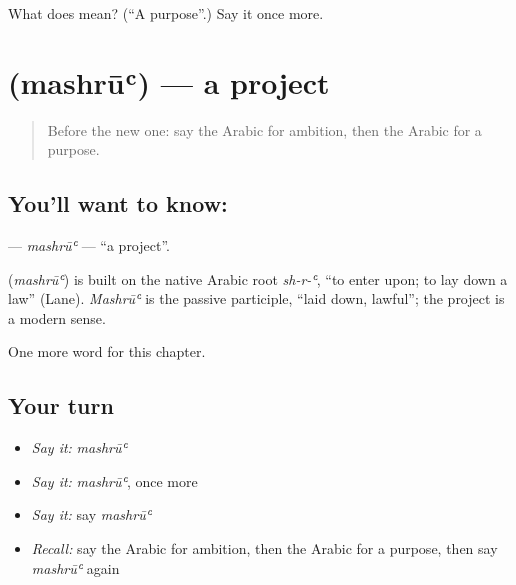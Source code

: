 \begin{tcolorbox}[breakable,colback=teal!4,colframe=teal!35!black,title={Before you move on}]
What does  mean? (\textquotedblleft{}A purpose\textquotedblright{}.) Say it once more.
\end{tcolorbox}
\section[\texorpdfstring{\ar{مشروع} (mashrūʿ)}{مشروع (mashrūʿ)}]{ (mashrūʿ) — a project}

\label{lesson:AR-C112-mashru}



\begin{quote}
Before the new one: say the Arabic for ambition, then the Arabic for a purpose.
\end{quote}

\subsection*{You'll want to know: }
\textbf{} — \emph{mashrūʿ} — \textquotedblleft{}a project\textquotedblright{}.

\begin{cousinweb}
\textbf{} (\emph{mashrūʿ}) is built on the native Arabic root \emph{sh-r-ʿ}, \textquotedblleft{}to enter upon; to lay down a law\textquotedblright{} (Lane). \emph{Mashrūʿ} is the passive participle, \textquotedblleft{}laid down, lawful\textquotedblright{}; the project is a modern sense.
\end{cousinweb}

\begin{grammarlens}[title={What you've built}]
One more word for this chapter.
\end{grammarlens}

\subsection*{Your turn}
\begin{itemize}
\raggedright
  \item \emph{Say it:} \emph{mashrūʿ}
  \item \emph{Say it:} \emph{mashrūʿ}, once more
  \item \emph{Say it:} say \emph{mashrūʿ}
  \item \emph{Recall:} say the Arabic for ambition, then the Arabic for a purpose, then say \emph{mashrūʿ} again
\end{itemize}

